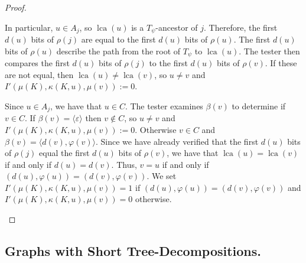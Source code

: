\documentclass[twoside,leqno]{article}
\providecommand{\qedhere}{}
\DeclareMathOperator{\lca}{lca}
\begin{document}
\begin{proof}
\begin{itemize}
          In particular, $u\in A_j$, so $\lca(u)$ is a $T_\psi$-ancestor of $j$.   Therefore, the first $d(u)$ bits of $\rho(j)$ are equal to the first $d(u)$ bits of $\rho(u)$.  The first $d(u)$ bits of $\rho(u)$ describe the path from the root of $T_\psi$ to $\lca(u)$.  The tester then compares the first $d(u)$ bits of $\rho(j)$ to the first $d(u)$ bits of $\rho(v)$.  If these are not equal,  then $\lca(u)\neq\lca(v)$, so $u\neq v$ and $I'(\mu(K),\kappa(K,u),\mu(v)):=0$.

          Since $u\in A_j$, we have that $u\in C$.  The tester examines $\beta(v)$ to determine if $v\in C$.  If $\beta(v)=\langle\varepsilon\rangle$ then $v\not\in C$, so $u\neq v$ and $I'(\mu(K),\kappa(K,u),\mu(v)):=0$. Otherwise $v\in C$ and $\beta(v)=\langle d(v),\varphi(v)\rangle$. Since we have already verified that the first $d(u)$ bits of $\rho(j)$ equal the first $d(u)$ bits of $\rho(v)$, we have that $\lca(u)=\lca(v)$ if and only if $d(u)=d(v)$. Thus, $v=u$ if and only if $(d(u),\varphi(u))=(d(v),\varphi(v))$.
          We set $I'(\mu(K),\kappa(K,u),\mu(v))=1$ if $(d(u),\varphi(u))=(d(v),\varphi(v))$ and $I'(\mu(K),\kappa(K,u),\mu(v))=0$ otherwise.\qedhere
  \end{itemize}
\end{proof}

\subsection{Graphs with Short Tree-Decompositions.}
\label{sec:short}
\end{document}
